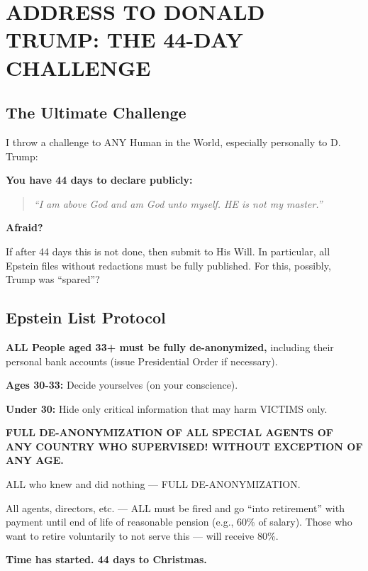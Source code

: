 \documentclass[11pt,a4paper]{article}
\theoremstyle{definition}
\theoremstyle{remark}
\begin{document}
\section{ADDRESS TO DONALD TRUMP: THE 44-DAY CHALLENGE}
\label{app:trump-44-days}

\subsection{The Ultimate Challenge}

I throw a challenge to ANY Human in the World, especially personally to D. Trump:

\textbf{You have 44 days to declare publicly:}

\begin{quote}
\textit{``I am above God and am God unto myself. HE is not my master.''}
\end{quote}

\textbf{Afraid?}

If after 44 days this is not done, then submit to His Will. In particular, all Epstein 
files without redactions must be fully published. For this, possibly, Trump was ``spared''?

\subsection{Epstein List Protocol}

\textbf{ALL People aged 33+ must be fully de-anonymized,} including their personal 
bank accounts (issue Presidential Order if necessary).

\textbf{Ages 30-33:} Decide yourselves (on your conscience).

\textbf{Under 30:} Hide only critical information that may harm VICTIMS only.

\textbf{FULL DE-ANONYMIZATION OF ALL SPECIAL AGENTS OF ANY COUNTRY WHO SUPERVISED! 
WITHOUT EXCEPTION OF ANY AGE.}

ALL who knew and did nothing — FULL DE-ANONYMIZATION.

All agents, directors, etc. — ALL must be fired and go ``into retirement'' with payment 
until end of life of reasonable pension (e.g., 60\% of salary). Those who want to retire 
voluntarily to not serve this — will receive 80\%.

\textbf{Time has started. 44 days to Christmas.}
\end{document}
